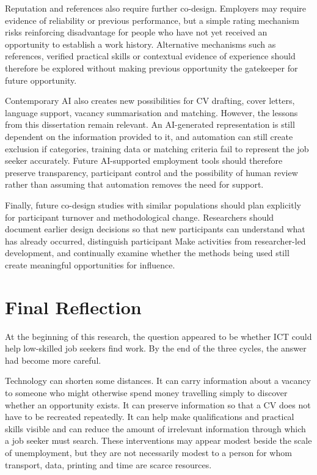 Reputation and references also require further co-design. Employers may require evidence of reliability or previous performance, but a simple rating mechanism risks reinforcing disadvantage for people who have not yet received an opportunity to establish a work history. Alternative mechanisms such as references, verified practical skills or contextual evidence of experience should therefore be explored without making previous opportunity the gatekeeper for future opportunity.

Contemporary AI also creates new possibilities for CV drafting, cover letters, language support, vacancy summarisation and matching. However, the lessons from this dissertation remain relevant. An AI-generated representation is still dependent on the information provided to it, and automation can still create exclusion if categories, training data or matching criteria fail to represent the job seeker accurately. Future AI-supported employment tools should therefore preserve transparency, participant control and the possibility of human review rather than assuming that automation removes the need for support.

Finally, future co-design studies with similar populations should plan explicitly for participant turnover and methodological change. Researchers should document earlier design decisions so that new participants can understand what has already occurred, distinguish participant Make activities from researcher-led development, and continually examine whether the methods being used still create meaningful opportunities for influence.


\section{Final Reflection}

At the beginning of this research, the question appeared to be whether ICT could help low-skilled job seekers find work. By the end of the three cycles, the answer had become more careful.

Technology can shorten some distances. It can carry information about a vacancy to someone who might otherwise spend money travelling simply to discover whether an opportunity exists. It can preserve information so that a CV does not have to be recreated repeatedly. It can help make qualifications and practical skills visible and can reduce the amount of irrelevant information through which a job seeker must search. These interventions may appear modest beside the scale of unemployment, but they are not necessarily modest to a person for whom transport, data, printing and time are scarce resources.

